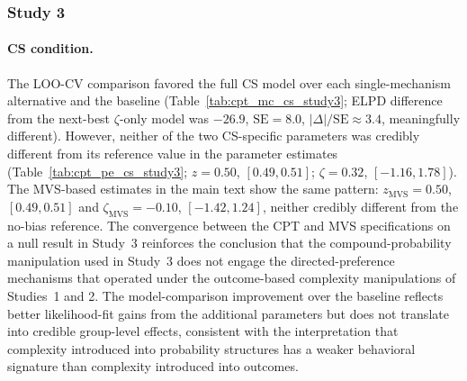 \documentclass[man,floatsintext]{apa7}
\begin{document}
\FloatBarrier

\subsubsection{Study 3}

\paragraph{CS condition.} The LOO-CV comparison favored the full CS model over each single-mechanism alternative and the baseline (Table~\ref{tab:cpt_mc_cs_study3}; ELPD difference from the next-best $\zeta$-only model was $-26.9$, $\mathrm{SE} = 8.0$, $|\Delta|/\mathrm{SE} \approx 3.4$, meaningfully different). However, neither of the two CS-specific parameters was credibly different from its reference value in the parameter estimates (Table~\ref{tab:cpt_pe_cs_study3}; $z = 0.50$, $[0.49, 0.51]$; $\zeta = 0.32$, $[-1.16, 1.78]$). The MVS-based estimates in the main text show the same pattern: $z_{\text{MVS}} = 0.50$, $[0.49, 0.51]$ and $\zeta_{\text{MVS}} = -0.10$, $[-1.42, 1.24]$, neither credibly different from the no-bias reference. The convergence between the CPT and MVS specifications on a null result in Study~3 reinforces the conclusion that the compound-probability manipulation used in Study~3 does not engage the directed-preference mechanisms that operated under the outcome-based complexity manipulations of Studies~1 and 2. The model-comparison improvement over the baseline reflects better likelihood-fit gains from the additional parameters but does not translate into credible group-level effects, consistent with the interpretation that complexity introduced into probability structures has a weaker behavioral signature than complexity introduced into outcomes.
\end{document}
